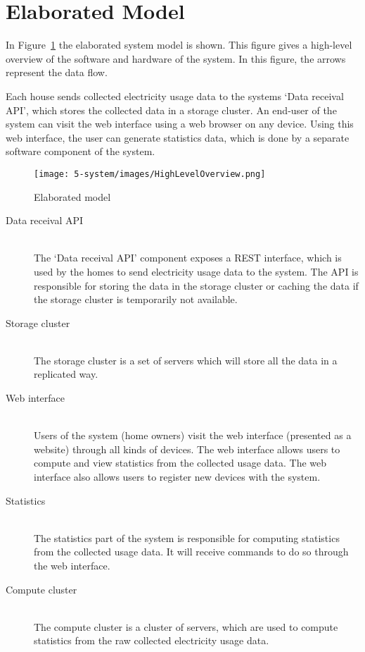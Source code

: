 \section{Elaborated Model}
\label{sec:elaboratedmodel}

In Figure~\ref{fig:elaboratedmodel} the elaborated system model is shown. This figure gives a high-level overview of the software and hardware of the system. In this figure, the arrows represent the data flow.

Each house sends collected electricity usage data to the systems `Data receival API', which stores the collected data in a storage cluster.
An end-user of the system can visit the web interface using a web browser on any device. Using this web interface, the user can generate statistics data, which is done by a separate software component of the system.


\begin{figure}[H]
	\centering
	\texttt{[image: 5-system/images/HighLevelOverview.png]}
	\caption{Elaborated model}
	\label{fig:elaboratedmodel}
\end{figure}

\begin{description}
	\item[Data receival API] ~\\ The `Data receival API' component exposes a REST interface, which is used by the homes to send electricity usage data to the system. The API is responsible for storing the data in the storage cluster or caching the data if the storage cluster is temporarily not available.
	
	\item[Storage cluster] ~\\ The storage cluster is a set of servers which will store all the data in a replicated way.
	
	\item[Web interface] ~\\ Users of the system (home owners) visit the web interface (presented as a website) through all kinds of devices. The web interface allows users to compute and view statistics from the collected usage data. The web interface also allows users to register new devices with the system.
	
	\item[Statistics] ~\\ The statistics part of the system is responsible for computing statistics from the collected usage data. It will receive commands to do so through the web interface.
	
	\item[Compute cluster] ~\\ The compute cluster is a cluster of servers, which are used to compute statistics from the raw collected electricity usage data.
	
\end{description}
